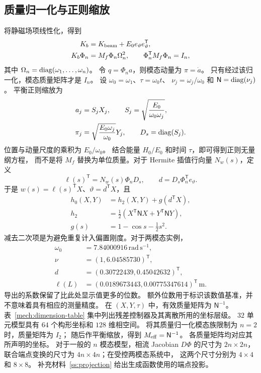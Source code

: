 \subsection{质量归一化与正则缩放}
\label{mech:canonical}
将静磁场项线性化，得到
\begin{align}
 K_b&=K_{\rm beam}+E_0e_\vartheta e_\vartheta^{\mathsf T},\nonumber\\
 K_b\Phi_n&=M_f\Phi_n\Omega_n^2,\qquad
 \Phi_n^{\mathsf T}M_f\Phi_n=I_n,
 \label{mech:modal-bias}
\end{align}
其中 $\Omega_n=\operatorname{diag}(\omega_1,\ldots,\omega_n)$。
令 $q=\Phi_na$，则模态动量为 $\pi=\dot a$。
只有经过该归一化，模态质量矩阵才是 $I_n$。
设 $\omega_0=\omega_1$、$\tau=\omega_0t$、
$\nu_j=\omega_j/\omega_0$ 和 $\mathsf N=\operatorname{diag}(\nu_j)$。
平衡正则缩放为
\begin{align}
 a_j&=S_jX_j,\qquad S_j=\sqrt{\frac{E_0}{\omega_0\omega_j}},\nonumber\\
 \pi_j&=\sqrt{\frac{E_0\omega_j}{\omega_0}}Y_j,
 \qquad D_s=\operatorname{diag}(S_j).
 \label{mech:scaling}
\end{align}
位置与动量尺度的乘积为 $E_0/\omega_0$。
结合能量 $H_0/E_0$ 和时间 $\tau$，即可得到正则无量纲方程，
而不是将 $M_f$ 替换为单位质量。对于 Hermite 插值行向量 $N_w(s)$，定义
\begin{equation}
 \ell(s)^{\mathsf T}=N_w(s)\Phi_nD_s,\qquad
 d=D_s\Phi_n^{\mathsf T}e_\vartheta.
 \label{mech:shape-maps}
\end{equation}
于是 $w(s)=\ell(s)^{\mathsf T}X$、$\vartheta=d^{\mathsf T}X$，且
\begin{align}
 h_0(X,Y)&=h_2(X,Y)+g(d^{\mathsf T}X),\nonumber\\
 h_2&=\tfrac12(X^{\mathsf T}\mathsf NX+Y^{\mathsf T}\mathsf NY),\nonumber\\
 g(s)&=1-\cos s-\tfrac12s^2.
 \label{mech:nominal-energy}
\end{align}
减去二次项是为避免重复计入偏置刚度。对于两模态实例，
\begin{align}
 \omega_0&=7.84000916\,\mathrm{rad\,s^{-1}},\nonumber\\
 \nu&=(1,6.04585730)^{\mathsf T},\nonumber\\
 d&=(0.30722439,0.45042632)^{\mathsf T},\nonumber\\
 \ell(L)&=(0.0189673443,0.00775347614)^{\mathsf T}\,\mathrm m.
 \label{mech:reduced-values}
\end{align}
导出的系数保留了比此处显示值更多的位数。
额外位数用于标识该数值基准，并不意味着具有相应的测量精度。
在 $(X,Y,\tau)$ 中，有效质量矩阵为 $\mathsf N^{-1}$。
表~\ref{mech:dimension-table} 集中列出残差控制器及其离散所用的坐标层级。
$32$ 单元模型具有 $64$ 个构形坐标和 $128$ 维相空间。
将其质量归一化模态族限制为 $n=2$ 时，质量矩阵为 $I_2$；
随后作平衡缩放，得到 $M_{\rm eff}=\mathsf N^{-1}$。
各质量矩阵均对应其所声明的坐标。
对于一般的 $n$ 模态模型，相流 Jacobian $D\Phi$ 的尺寸为 $2n\times2n$，
联合端点变换的尺寸为 $4n\times4n$；在受控两模态系统中，
这两个尺寸分别为 $4\times4$ 和 $8\times8$。
补充材料~\ref{ss:projection} 给出生成函数使用的端点投影。

